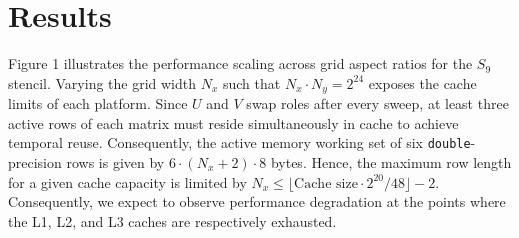 \section{Results}
Figure 1 illustrates the performance scaling across grid aspect ratios for the $S_9$ stencil. 
Varying the grid width $N_x$ such that $N_x \cdot N_y = 2^{24}$ exposes the cache limits of each platform. 
Since $U$ and $V$ swap roles after every sweep, at least three active rows of each matrix must reside simultaneously in cache to achieve temporal reuse. 
Consequently, the active memory working set of six \texttt{double}-precision rows is given by $6 \cdot (N_x + 2) \cdot 8$ bytes. 
Hence, the maximum row length for a given cache capacity is limited by $N_x \leq \lfloor \text{Cache size} \cdot 2^{20} / 48 \rfloor - 2$. 
Consequently, we expect to observe performance degradation at the points where the L1, L2, and L3 caches are respectively exhausted.
